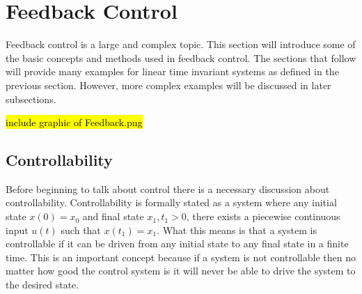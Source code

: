 \section{Feedback Control}

Feedback control is a large and complex topic. This section will
introduce some of the basic concepts and methods used in feedback
control. The sections that follow will provide many examples for linear time invariant systems as defined in the previous section. However, more complex examples will be discussed in later subsections. 

\hl{include graphic of Feedback.png}

\subsection{Controllability}

Before beginning to talk about control there is a necessary discussion about controllability. Controllability is formally stated as a system where any initial state $x(0)=x_0$ and final state $x_1,t_1>0$, there exists a piecewise continuous input $u(t)$ such that $x(t_1)=x_1$. What this means is that a system is controllable if it can be driven from any initial state to any final state in a finite time. This is an important concept because if a system is not controllable then no matter how good the control system is it will never be able to drive the system to the desired state.

